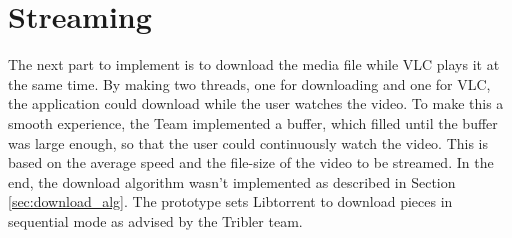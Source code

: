 \section{Streaming}
\thispagestyle{fancy}
The next part to implement is to download the media file while VLC plays it at the same time. By making two threads, one for downloading and one for VLC, the application could download while the user watches the video. To make this a smooth experience, the Team implemented a buffer, which filled until the buffer was large enough, so that the user could continuously watch the video. This is based on the average speed and the file-size of the video to be streamed. In the end, the download algorithm wasn't implemented as described in Section \ref{sec:download_alg}. The prototype sets Libtorrent to download pieces in sequential mode as advised by the Tribler team. 